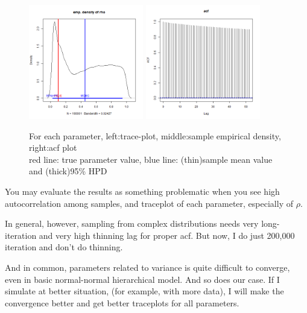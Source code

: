 \documentclass{article}
\begin{document}
\begin{figure}[h]
    \includegraphics[width=5cm]{prob3_rho_density.png} 
    \includegraphics[width=5cm]{prob3_rho_acf.png} \\
    \caption{For each parameter, left:trace-plot, middle:sample empirical density, right:acf plot\\
    red line: true parameter value, blue line: (thin)sample mean value and (thick)95\% HPD}

\end{figure}
\clearpage

You may evaluate the results as something problematic when you see 
high autocorrelation among samples, and traceplot of each parameter, especially of $\rho$.

In general, however, sampling from complex distributions needs very long-iteration and
very high thinning lag for proper acf. But now, I do just 200,000 iteration and don't do thinning.

And in common, parameters related to variance is quite difficult to converge,
even in basic normal-normal hierarchical model. And so does our case.
If I simulate at better situation, (for example, with more data),
I will make the convergence better and get better traceplots for all parameters.
\end{document}
